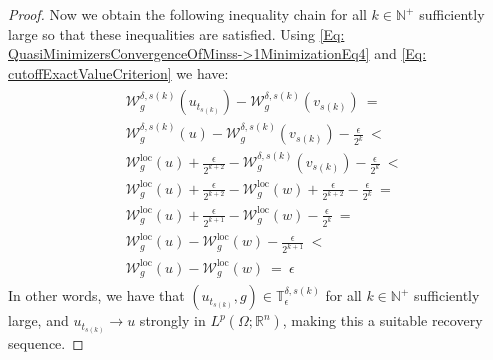 \documentclass[11pt, reqno]{amsart}   	%
\theoremstyle{plain}
\numberwithin{equation}{section}
\def\de{\delta}
\def\ep{\epsilon}
\def\Om{\Omega}
\def\N{\mathbb{N}}
\def\R{\mathbb{R}}
\def\loc{\text{loc}}
\begin{document}
\begin{proof}
     
     Now we obtain the following inequality chain for all $k \in \N^+$ sufficiently large so that these inequalities are satisfied. Using \eqref{Eq: QuasiMinimizersConvergenceOfMinss->1MinimizationEq4} and \eqref{Eq: cutoffExactValueCriterion} we have:
     \begin{eqnarray}\label{Eq: grandInequalityChainEpsilon}
         \begin{aligned}
             &\mathcal{W}^{\de, s(k)}_g(u_{t_{s(k)}}) - \mathcal{W}^{\de, s(k)}_g(v_{s(k)}) \ = \ \\
             & \mathcal{W}^{\de, s(k)}_g(u) - \mathcal{W}^{\de, s(k)}_g(v_{s(k)}) - \frac{\ep}{2^k} \ < \ \\
             & \mathcal{W}^{\loc}_g(u) + \frac{\ep}{2^{k + 2}} - \mathcal{W}^{\de, s(k)}_g(v_{s(k)}) - \frac{\ep}{2^k} \ < \ \\
             & \mathcal{W}^{\loc}_g(u) + \frac{\ep}{2^{k + 2}} - \mathcal{W}^{\loc}_g(w) + \frac{\ep}{2^{k + 2}} - \frac{\ep}{2^k} \ = \ \\
             & \mathcal{W}^{\loc}_g(u) + \frac{\ep}{2^{k + 1}} - \mathcal{W}^{\loc}_g(w)  - \frac{\ep}{2^k} \ = \ \\
             & \mathcal{W}^{\loc}_g(u)  - \mathcal{W}^{\loc}_g(w)  - \frac{\ep}{2^{k + 1}} \ < \ \\
             &\mathcal{W}^{\loc}_g(u) - \mathcal{W}^{\loc}_g(w) \ = \ \ep
         \end{aligned}
     \end{eqnarray}
     In other words, we have that $(u_{t_{s(k)}}, g) \in \mathbb{T}^{\de, s(k)}_{\ep}$ for all $k \in \N^+$ sufficiently large, and $u_{t_{s(k)}} \rightarrow u$ strongly in $L^p(\Om; \R^n)$, making this a suitable recovery sequence.


\end{proof}
\end{document}
